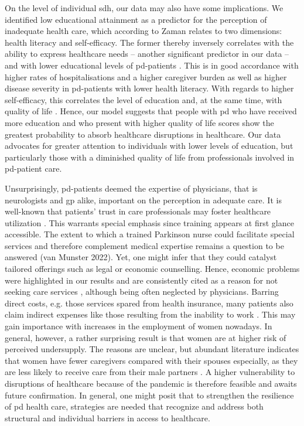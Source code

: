 \documentclass{bmcart}
\begin{document}
On the level of individual \ac{sdh}, our data may also have some implications. We identified low educational attainment as a predictor for the perception of inadequate health care, which according to Zaman \cite{zaman2021barriers} relates to two dimensions: health literacy and self-efficacy. The former thereby inversely correlates with the ability to express healthcare needs \cite{davis2003variability, hurt2019barriers} -- another significant predictor in our data -- and with lower educational levels of \ac{pd}-patients \cite{fleisher2016associations}. This is in good accordance with higher rates of hospitalisations and a higher caregiver burden \cite{fleisher2016associations} as well as higher disease severity \cite{fleisher2016associations} in \ac{pd}-patients with lower health literacy. With regards to higher self-efficacy, this correlates the level of education\cite{lim2020factors} and, at the same time, with quality of life \cite{rostagni2022gratitude, lim2020factors}. Hence, our model suggests that people with \ac{pd} who have received more education and who present with higher quality of life scores show the greatest probability to absorb healthcare disruptions in healthcare. Our data advocates for greater attention to individuals with lower levels of education, but particularly those with a diminished quality of life from professionals involved in \ac{pd}-patient care.

Unsurprisingly, \ac{pd}-patients deemed the expertise of physicians, that is neurologists and \ac{gp} alike, important on the perception in adequate care. It is well-known that patients' trust in care professionals may foster healthcare utilization \cite{bainbridge2009challenges, shin2016initiation}. This warrants special emphasis since training appears at first glance accessible. The extent to which a trained Parkinson nurse could facilitate special services and therefore complement medical expertise remains a question to be answered (van Munster 2022). Yet, one might infer that they could catalyst tailored offerings such as legal or economic counselling. Hence, economic problems were highlighted in our results and are consistently cited as a reason for not seeking care services \cite{zaman2021barriers}, although being often neglected by physicians. Barring direct costs, e.g. those services spared from health insurance, many patients also claim indirect expenses like those resulting from the inability to work \cite{spottke2005cost}. This may gain importance with increases in the employment of women nowadays.  In general, however, a rather surprising result is that women are at higher risk of perceived undersupply. The reasons are unclear, but abundant literature indicates that women have fewer caregivers compared with their spouses \cite{dahodwala2018sex} especially, as they are less likely to receive care from their male partners \cite{zaman2021barriers}. A higher vulnerability to disruptions of healthcare because of the pandemic is therefore feasible and awaits future confirmation. In general, one might posit that to strengthen the resilience of \ac{pd} health care, strategies are needed that recognize and address both structural and individual barriers in access to healthcare.
\end{document}
